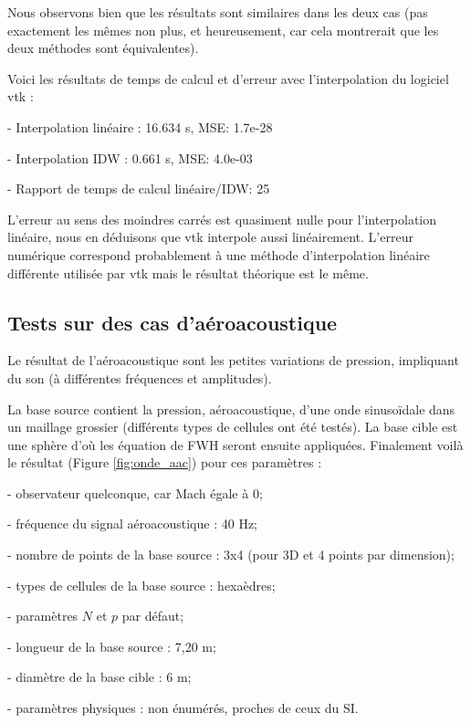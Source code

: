 Nous observons bien que les résultats sont similaires dans les deux cas (pas exactement les mêmes non plus, et heureusement, car cela montrerait que les deux méthodes sont équivalentes).

Voici les résultats de temps de calcul et d'erreur avec l'interpolation du logiciel vtk :

- Interpolation linéaire :         16.634 s, MSE: 1.7e-28

- Interpolation IDW :\hspace{0,4cm} 0.661 s, MSE: 4.0e-03

- Rapport de temps de calcul linéaire/IDW: 25

L'erreur au sens des moindres carrés est quasiment nulle pour l'interpolation linéaire, nous en déduisons que vtk interpole aussi linéairement. L'erreur numérique correspond probablement à une méthode d'interpolation linéaire différente utilisée par vtk mais le résultat théorique est le même.

\subsection{Tests sur des cas d'aéroacoustique}

Le résultat de l'aéroacoustique sont les petites variations de pression, impliquant du son (à différentes fréquences et amplitudes).

La base source contient la pression, aéroacoustique, d'une onde sinusoïdale dans un maillage grossier (différents types de cellules ont été testés). La base cible est une sphère d'où les équation de FWH seront ensuite appliquées. Finalement voilà le résultat (Figure \ref{fig:onde_aac}) pour ces paramètres :

- observateur quelconque, car Mach égale à 0;

- fréquence du signal aéroacoustique : 40 Hz;

- nombre de points de la base source : 3x4 (pour 3D et 4 points par dimension);

- types de cellules de la base source : hexaèdres;

- paramètres \(N\) et \(p\) par défaut;

- longueur de la base source : 7,20 m;

- diamètre de la base cible : 6 m;

- paramètres physiques : non énumérés, proches de ceux du \ac{SI}. 

